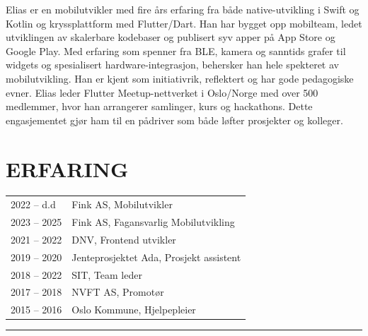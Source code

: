 \documentclass[a4paper,10pt]{article}
\begin{document}
\begin{paracol}{2}
\begin{flushleft}
\begin{tcolorbox}
    Elias er en mobilutvikler med 
    fire års erfaring fra både native-utvikling
     i Swift og Kotlin og kryssplattform med Flutter/Dart.
      Han har bygget opp mobilteam,
       ledet utviklingen av skalerbare
        kodebaser og publisert syv apper 
        på App Store og Google Play. 
        Med erfaring som spenner fra BLE,
         kamera og sanntids grafer til widgets 
         og spesialisert hardware-integrasjon,
          behersker han hele spekteret av
           mobilutvikling.
      Han er kjent som initiativrik, 
      reflektert og har gode pedagogiske evner.
       Elias leder Flutter Meetup-nettverket i 
       Oslo/Norge med over 500 medlemmer,
        hvor han arrangerer samlinger, 
        kurs og hackathons. 
        Dette engasjementet 
        gjør ham til en pådriver som både løfter
         prosjekter og kolleger.
    \end{tcolorbox}
\end{flushleft}

\switchcolumn

\vspace{5em}
\begin{center}
    
\end{center}
\vspace{2em}

 
\section{\ubuntu ERFARING}
\renewcommand{\arraystretch}{1.3} %
\begin{tabularx}{\columnwidth}{@{}lX@{}}
2022 -- d.d & Fink AS, Mobilutvikler \\
2023 -- 2025 & Fink AS, Fagansvarlig Mobilutvikling \\
2021 -- 2022 & DNV, Frontend utvikler \\
2019 -- 2020 & Jenteprosjektet Ada, Prosjekt assistent \\
2018 -- 2022 & SIT, Team leder \\
2017 -- 2018 & NVFT AS, Promotør \\
2015 -- 2016 & Oslo Kommune, Hjelpepleier \\
\end{tabularx}

\vspace{0.5em} 
\noindent\rule{\linewidth}{0.2pt}


\end{paracol}
\end{document}
